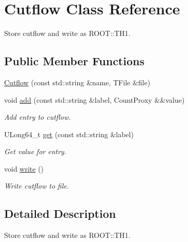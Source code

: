 \hypertarget{classCutflow}{}\section{Cutflow Class Reference}
\label{classCutflow}


Store cutflow and write as R\+O\+O\+T\+::\+T\+H1.  


\subsection*{Public Member Functions}
\begin{DoxyCompactItemize}
\item 
\mbox{\hyperlink{classCutflow_a31b22d110f2cbdff8ab7c8c836594856}{Cutflow}} (const std\+::string \&name, T\+File \&file)
\item 
\mbox{\label{classCutflow_a41a14c86981a12325e77efdbc039fb92}} 
void \mbox{\hyperlink{classCutflow_a41a14c86981a12325e77efdbc039fb92}{add}} (const std\+::string \&label, Count\+Proxy \&\&value)
\begin{DoxyCompactList}\small\item\em Add entry to cutflow. \end{DoxyCompactList}\item 
\mbox{\label{classCutflow_a13000dd0851963151fa86dba362e9ce0}} 
U\+Long64\+\_\+t \mbox{\hyperlink{classCutflow_a13000dd0851963151fa86dba362e9ce0}{get}} (const std\+::string \&label)
\begin{DoxyCompactList}\small\item\em Get value for entry. \end{DoxyCompactList}\item 
\mbox{\label{classCutflow_a81c6ec1452c8445eeb009b4fcd9391e1}} 
void \mbox{\hyperlink{classCutflow_a81c6ec1452c8445eeb009b4fcd9391e1}{write}} ()
\begin{DoxyCompactList}\small\item\em Write cutflow to file. \end{DoxyCompactList}\end{DoxyCompactItemize}


\subsection{Detailed Description}
Store cutflow and write as R\+O\+O\+T\+::\+T\+H1. 

